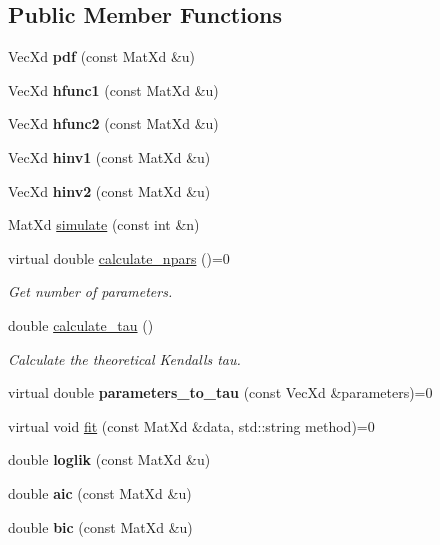 \subsection*{Public Member Functions}
\begin{DoxyCompactItemize}
\item 
Vec\+Xd {\bfseries pdf} (const Mat\+Xd \&u)
\item 
Vec\+Xd {\bfseries hfunc1} (const Mat\+Xd \&u)
\item 
Vec\+Xd {\bfseries hfunc2} (const Mat\+Xd \&u)
\item 
Vec\+Xd {\bfseries hinv1} (const Mat\+Xd \&u)
\item 
Vec\+Xd {\bfseries hinv2} (const Mat\+Xd \&u)
\item 
Mat\+Xd \hyperlink{class_bicop_afa62d40a17e096cc0f7e769fb2a1285d}{simulate} (const int \&n)
\item 
\mbox{\label{class_bicop_a21f37d9e51460c13be57e48c3d1e7ba4}} 
virtual double \hyperlink{class_bicop_a21f37d9e51460c13be57e48c3d1e7ba4}{calculate\+\_\+npars} ()=0
\begin{DoxyCompactList}\small\item\em Get number of parameters. \end{DoxyCompactList}\item 
\mbox{\label{class_bicop_abe228ece449fb66996f91b0fcfed60d3}} 
double \hyperlink{class_bicop_abe228ece449fb66996f91b0fcfed60d3}{calculate\+\_\+tau} ()
\begin{DoxyCompactList}\small\item\em Calculate the theoretical Kendall\textquotesingle{}s tau. \end{DoxyCompactList}\item 
\mbox{\label{class_bicop_aadd4f372b89a2389348893633ec238ba}} 
virtual double {\bfseries parameters\+\_\+to\+\_\+tau} (const Vec\+Xd \&parameters)=0
\end{DoxyCompactItemize}
\textbf{ }\par
\begin{DoxyCompactItemize}
\item 
virtual void \hyperlink{class_bicop_a0ff40d8054e11ed8aaa4956c7fd84e89}{fit} (const Mat\+Xd \&data, std\+::string method)=0
\item 
\mbox{\label{class_bicop_a994d28aa99b881425f012605aef3ae68}} 
double {\bfseries loglik} (const Mat\+Xd \&u)
\item 
\mbox{\label{class_bicop_adb4aecd877fc32cc857e2477d5bddf9b}} 
double {\bfseries aic} (const Mat\+Xd \&u)
\item 
\mbox{\label{class_bicop_a68ee43f29c026aaf8157673c1ddf29b2}} 
double {\bfseries bic} (const Mat\+Xd \&u)
\end{DoxyCompactItemize}

